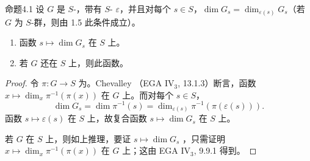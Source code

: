 \begin{SGAresult}{命题}{4.1}
设 $G$ 是 $S$-，带有 $S$- $\varepsilon$，并且对每个 $s\in S$，$\dim G_s=\dim_{\varepsilon(s)}G_s$（若 $G$ 为 $S$-群，则由 1.5 此条件成立）。
\begin{enumerate}
\item[(i)] 函数 $s\mapsto\dim G_s$ 在 $S$ 上。
\item[(ii)] 若 $G$ 还在 $S$ 上，则此函数。
\end{enumerate}
\end{SGAresult}
\begin{proof}
令 $\pi:G\to S$ 为。Chevalley （EGA IV$_3$, 13.1.3）断言，函数 $x\mapsto\dim_x\pi^{-1}(\pi(x))$ 在 $G$ 上。而对每个 $s\in S$，
\[
\dim G_s=\dim\pi^{-1}(s)=\dim_{\varepsilon(s)}\pi^{-1}(\pi(\varepsilon(s))).
\]
函数 $s\mapsto\varepsilon(s)$ 在 $S$ 上，故复合函数 $s\mapsto\dim G_s$ 在 $S$ 上。

若 $G$ 在 $S$ 上，则如上推理，要证 $s\mapsto\dim G_s$ ，只需证明 $x\mapsto\dim_x\pi^{-1}(\pi(x))$ 在 $G$ 上；这由 EGA IV$_3$, 9.9.1 得到。
\end{proof}
